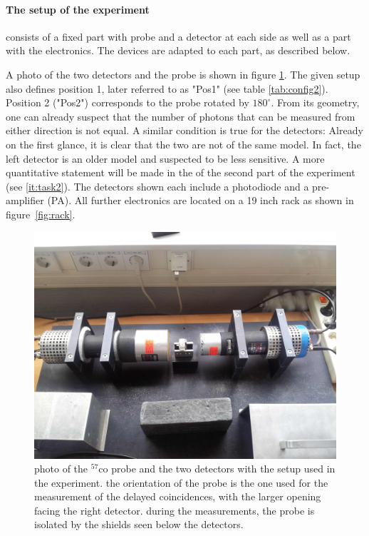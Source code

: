 \paragraph{The setup of the experiment}
consists of a fixed part with probe and a detector at each side 
as well as a part with the electronics. The devices are adapted to each part, as described below. 

A photo of the two detectors and the probe is shown in figure \ref{fig:position_1}. The given setup also 
defines position 1, later referred to as "Pos1" (see table \ref{tab:config2}). Position 2 ("Pos2") corresponds 
to the probe rotated by $180^\circ$. From its geometry, one can already suspect that the number of photons 
that can be measured from either direction is not equal. A similar condition is true for the detectors:
Already on the first glance, it is clear that the two are not of the same model. In fact, the left detector 
is an older model and suspected to be less sensitive. A more quantitative statement will be made in the 
of the second part of the experiment (see \ref{it:task2}). The detectors shown each include a photodiode 
and a pre-amplifier (PA). 
All further electronics are located on a 19 inch rack as shown in figure~\ref{fig:rack}.

\begin{figure}[h]
    \centering
    \includegraphics[width=0.8\linewidth]{figures/position_1.jpg}
    \caption{
        photo of the $^{57}$co probe and the two detectors with the setup used in the 
        experiment. the orientation of the probe is the one used for the measurement of 
        the delayed coincidences, with the larger opening facing the right detector. 
        during the measurements, the probe is isolated by the shields seen below the detectors.
        }
    \label{fig:position_1}
\end{figure}


